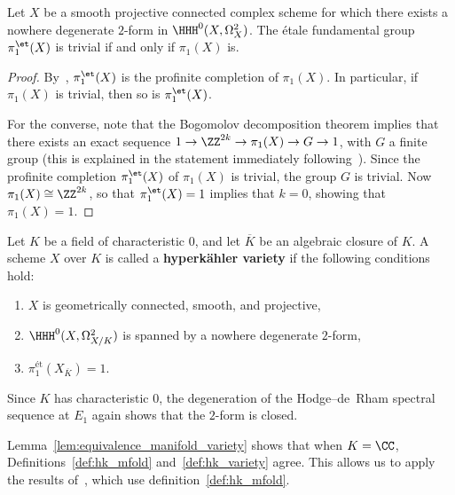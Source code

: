 \begin{lemma}\label{lem:equivalence_manifold_variety}
Let $X$ be a smooth projective connected complex scheme for which there exists a nowhere degenerate $2$-form in $\HHH^0(X,\Omega^2_X)$. The \'etale fundamental group $\pi_1^{\et}(X)$ is trivial if and only if $\pi_1(X)$ is.
\end{lemma}
\begin{proof}
By~\cite[Corollaire~XII.5.2]{SGA1}, $\pi_1^{\et}(X)$ is the profinite completion of $\pi_1(X)$. In particular, if $\pi_1(X)$ is trivial, then so is $\pi_1^{\et}(X)$.

For the converse, note that the Bogomolov decomposition theorem implies that there exists an exact sequence $1 \rightarrow \ZZ^{2k} \rightarrow \pi_1(X) \rightarrow G \rightarrow 1$, with $G$ a finite group (this is explained in the statement immediately following~\cite[Th\'eor\`eme~1]{Beauville}). Since the profinite completion $\pi_1^{\et}(X)$ of $\pi_1(X)$ is trivial, the group $G$ is trivial. Now $\pi_1(X) \cong \ZZ^{2k}$, so that $\pi_1^{\et}(X) = 1$ implies that $k = 0$, showing that $\pi_1(X) = 1$.
\end{proof}

\begin{definition}\label{def:hk_variety}
Let $K$ be a field of characteristic $0$, and let $\overline{K}$ be an algebraic closure of $K$. A scheme ${X}$ over ${K}$ is called a {\bfseries hyperk\"ahler variety} if the following conditions hold:
    \begin{enumerate}
        \item $X$ is geometrically connected, smooth, and projective,
        \item $\HHH^0(X,\Omega^2_{{X}/{K}})$ is spanned by a nowhere degenerate $2$-form,
        \item $\pi_1^{\textrm{\'et}}(X_{\overline{K}}) = 1$.
    \end{enumerate}
\end{definition}

\begin{remark}
Since $K$ has characteristic $0$, the degeneration of the Hodge--de~Rham spectral sequence at $E_1$ again shows that the $2$-form is closed.
\end{remark}

\begin{remark}
Lemma~\ref{lem:equivalence_manifold_variety} shows that when $K = \CC$, Definitions~\ref{def:hk_mfold} and~\ref{def:hk_variety} agree. This allows us to apply the results of~\cite{Beauville}, which use definition~\ref{def:hk_mfold}.
\end{remark}

